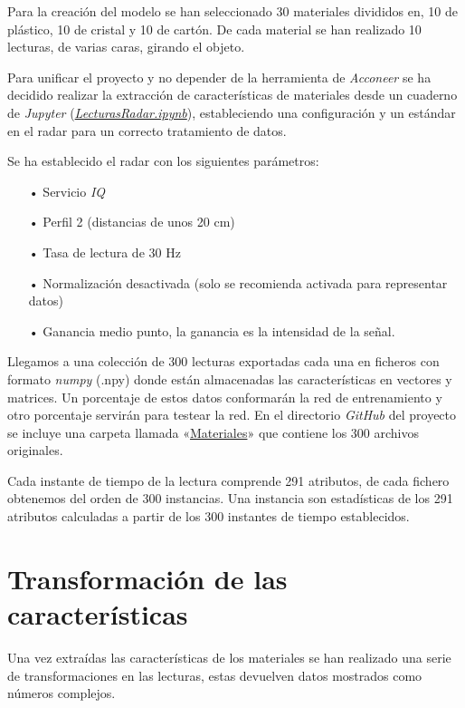 Para la creación del modelo se han seleccionado 30 materiales divididos en, 10 de plástico, 10 de cristal y 10 de cartón. De cada material se han realizado 10 lecturas, de varias caras, girando el objeto.

Para unificar el proyecto y no depender de la herramienta de \textit{Acconeer} se ha decidido realizar la extracción de características de materiales desde un cuaderno de \textit{Jupyter} (\textit{\href{https://github.com/mecyc/TFG_RADAR_60GHZ/blob/main/scripts/LecturasRadar.ipynb}{LecturasRadar.ipynb}}), estableciendo una configuración y un estándar en el radar para un correcto tratamiento de datos.

Se ha establecido el radar con los siguientes parámetros:
\begin{itemize}
	\item[•]Servicio \textit{IQ}
	\item[•]Perfil 2 (distancias de unos 20 cm)
	\item[•]Tasa de lectura de 30 Hz
	\item[•]Normalización desactivada (solo se recomienda activada para representar datos)
	\item[•]Ganancia medio punto, la ganancia es la intensidad de la señal.
\end{itemize}


Llegamos a una colección de 300 lecturas exportadas cada una en ficheros con formato \textit{numpy} (.npy) donde están almacenadas las características en vectores y matrices. Un porcentaje de estos datos conformarán la red de entrenamiento y otro porcentaje servirán para testear la red. En el directorio \textit{GitHub} del proyecto se incluye una carpeta llamada «\href{https://github.com/mecyc/TFG_RADAR_60GHZ/tree/main/Materiales}{Materiales}» que contiene los 300 archivos originales.

Cada instante de tiempo de la lectura comprende 291 atributos, de cada fichero obtenemos del orden de 300 instancias. Una instancia son estadísticas de los 291 atributos calculadas a partir de los 300 instantes de tiempo establecidos.


\section{Transformación de las características}

Una vez extraídas las características de los materiales se han realizado una serie de transformaciones en las lecturas, estas devuelven datos mostrados como números complejos.

